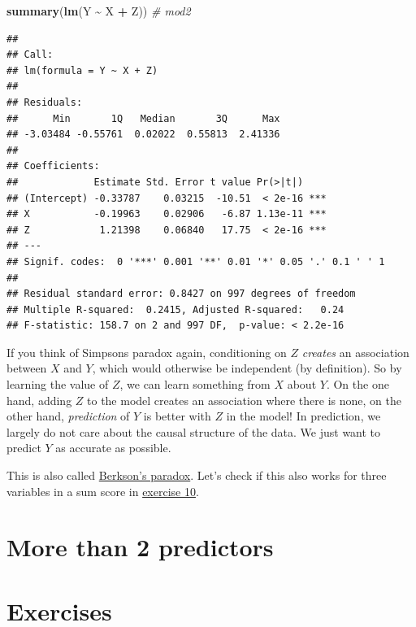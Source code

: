\documentclass[
]{book}
\newenvironment{Shaded}{\begin{snugshade}}{\end{snugshade}}
\newcommand{\CommentTok}[1]{\textcolor[rgb]{0.56,0.35,0.01}{\textit{#1}}}
\newcommand{\FunctionTok}[1]{\textcolor[rgb]{0.13,0.29,0.53}{\textbf{#1}}}
\newcommand{\NormalTok}[1]{#1}
\newcommand{\SpecialCharTok}[1]{\textcolor[rgb]{0.81,0.36,0.00}{\textbf{#1}}}
\begin{document}
\begin{Shaded}
\begin{Highlighting}[]
\FunctionTok{summary}\NormalTok{(}\FunctionTok{lm}\NormalTok{(Y }\SpecialCharTok{\textasciitilde{}}\NormalTok{ X }\SpecialCharTok{+}\NormalTok{ Z)) }\CommentTok{\# mod2}
\end{Highlighting}
\end{Shaded}

\begin{verbatim}
## 
## Call:
## lm(formula = Y ~ X + Z)
## 
## Residuals:
##      Min       1Q   Median       3Q      Max 
## -3.03484 -0.55761  0.02022  0.55813  2.41336 
## 
## Coefficients:
##             Estimate Std. Error t value Pr(>|t|)    
## (Intercept) -0.33787    0.03215  -10.51  < 2e-16 ***
## X           -0.19963    0.02906   -6.87 1.13e-11 ***
## Z            1.21398    0.06840   17.75  < 2e-16 ***
## ---
## Signif. codes:  0 '***' 0.001 '**' 0.01 '*' 0.05 '.' 0.1 ' ' 1
## 
## Residual standard error: 0.8427 on 997 degrees of freedom
## Multiple R-squared:  0.2415, Adjusted R-squared:   0.24 
## F-statistic: 158.7 on 2 and 997 DF,  p-value: < 2.2e-16
\end{verbatim}

If you think of Simpsons paradox again, conditioning on \(Z\) \emph{creates} an association between \(X\) and \(Y\),
which would otherwise be independent (by definition). So by learning the value of \(Z\), we can learn something
from \(X\) about \(Y\). On the one hand, adding \(Z\) to the model creates an association where there is none,
on the other hand, \emph{prediction} of \(Y\) is better with \(Z\) in the model! In prediction, we largely
do not care about the causal structure of the data. We just want to predict \(Y\) as accurate as possible.

This is also called \href{https://en.wikipedia.org/wiki/Berkson\%27s_paradox}{Berkson's paradox}.
Let's check if this also works for three variables in a sum score
in \hyperref[exercise10_multiple_regression]{exercise 10}.

\section{More than 2 predictors}\label{more-than-2-predictors}

\section{Exercises}\label{exercises-2}
\end{document}
